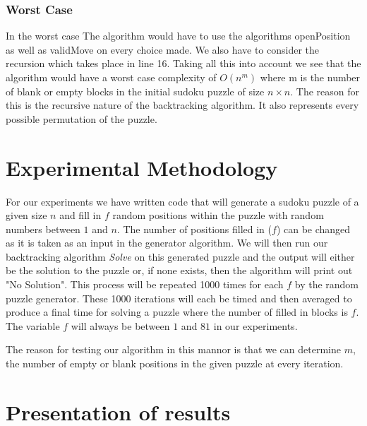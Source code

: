 \documentclass[12pt,a4paper,titlepage]{article}
\begin{document}
\subsubsection{Worst Case}

In the worst case The algorithm would have to use the algorithms openPosition as well as validMove on every choice made. We also have to consider the recursion which takes place in line 16. Taking all this into account we see that the algorithm would have a worst case complexity of $O(n^{m})$ where m is the number of blank or empty blocks in the initial sudoku puzzle of size $n \times n$. The reason for this is the recursive nature of the backtracking algorithm. It also represents every possible permutation of the puzzle.


\section{Experimental Methodology}

For our experiments we have written code that will generate a sudoku puzzle of a given size $n$ and fill in $f$ random positions within the puzzle with random numbers between $1$ and $n$. The number of positions filled in ($f$) can be changed as it is taken as an input in the generator algorithm. We will then run our backtracking algorithm \emph{Solve} on this generated puzzle and the output will either be the solution to the puzzle or, if none exists, then the algorithm will print out "No Solution". This process will be repeated 1000 times for each $f$ by the random puzzle generator. These 1000 iterations will each be timed and then averaged to produce a final time for solving a puzzle where the number of filled in blocks is $f$. The variable $f$ will always be between $1$ and $81$ in our experiments.

The reason for testing our algorithm in this mannor is that we can determine $m$, the number of empty or blank positions in the given puzzle at every iteration.  

\section{Presentation of results}
\end{document}
